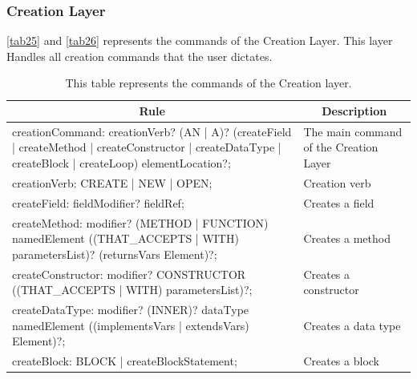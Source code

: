 \subsubsection{Creation Layer}
\autoref{tab25} and \autoref{tab26} represents the commands of the Creation Layer. This layer Handles all creation commands that the user dictates.
\begin{table}[H]
\centering
\begin{tabular}{|p{8cm}|p{7cm}|}
\hline
\multicolumn{1}{|c|}{{\bf Rule}} & \multicolumn{1}{c|}{{\bf Description}} \\ \hline
creationCommand: creationVerb? (AN | A)? (createField | createMethod | createConstructor | createDataType | createBlock | createLoop) elementLocation?; & The main command of the Creation Layer \\ \hline
creationVerb: CREATE | NEW | OPEN; & Creation verb                          \\ \hline
createField: fieldModifier? fieldRef; & Creates a field                        \\ \hline
createMethod: modifier? (METHOD | FUNCTION) namedElement ((THAT\_ACCEPTS | WITH) parametersList)? (returnsVars Element)?;                               & Creates a method                       \\ \hline
createConstructor: modifier? CONSTRUCTOR ((THAT\_ACCEPTS | WITH) parametersList)?;                                                                      & Creates a constructor                  \\ \hline
createDataType: modifier? (INNER)? dataType namedElement ((implementsVars | extendsVars) Element)?;                                                     & Creates a data type                    \\ \hline
createBlock: BLOCK | createBlockStatement;                                                                                                              & Creates a block                        \\ \hline
\end{tabular}
\caption{This table represents the commands of the Creation layer.}
\label{tab25}
\end{table}

